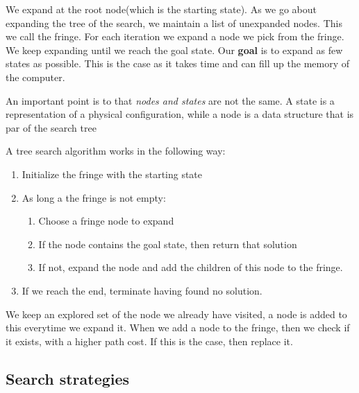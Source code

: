 \documentclass{article}
\begin{document}
We expand at the root node(which is the starting state). As we go about
expanding the tree of the search, we maintain a list of unexpanded nodes. This
we call the fringe. For each iteration we expand a node we pick from the fringe.
We keep expanding until we reach the goal state. Our \textbf{goal} is to expand
as few states as possible. This is the case as it takes time and can fill up the
memory of the computer.

An important point is to that \emph{nodes and states} are not the same. A state
is a representation of a physical configuration, while a node is a data
structure that is par of the search tree\cite[p.
19]{presentation:solving_problems_by_searching}

A tree search algorithm works in the following way:
\begin{enumerate}
  \item Initialize the fringe with the starting state
  \item As long a the fringe is not empty:
    \begin{enumerate}
      \item Choose a fringe node to expand
      \item If the node contains the goal state, then return that solution
      \item If not, expand the node and add the children of this node to the
        fringe.
    \end{enumerate}
  \item If we reach the end, terminate having found no solution.
\end{enumerate}
We keep an explored set of the node we already have visited, a node is added to
this everytime we expand it. When we add a node to the fringe, then we check if
it exists, with a higher path cost. If this is the case, then replace it.

\subsection{Search strategies}%
\label{ssub:search_strategies}
\end{document}

